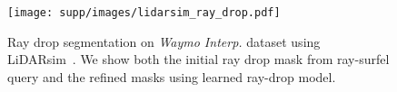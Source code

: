 \begin{figure}[t]
\centering
\texttt{[image: supp/images/lidarsim\_ray\_drop.pdf]}

\caption{Ray drop segmentation on \textit{Waymo Interp.} dataset using LiDARsim~\cite{manivasagam2020lidarsim}. We show both the initial ray drop mask from ray-surfel query and the refined masks using learned ray-drop model.}
\label{fig:supp_lidarsim_raydrop}

\end{figure}